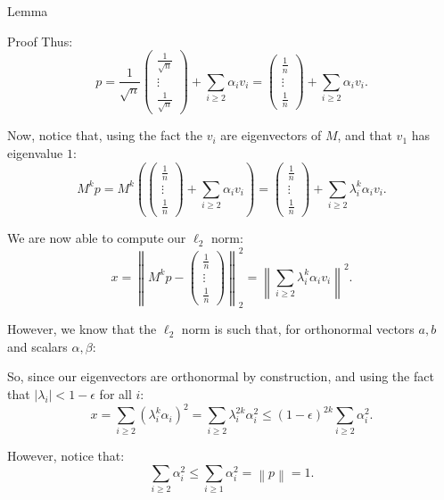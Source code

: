 \documentclass[a4paper]{article}
\begin{document}
\begin{parag}{Lemma}
\begin{subparag}{Proof}
        Thus: 
        \[p = \frac{1}{\sqrt{n}} \begin{pmatrix} \frac{1}{\sqrt{n}} \\ \vdots \\ \frac{1}{\sqrt{n}} \end{pmatrix} + \sum_{i \geq 2} \alpha_i v_i = \begin{pmatrix} \frac{1}{n} \\ \vdots \\ \frac{1}{n} \end{pmatrix} + \sum_{i \geq 2} \alpha_i v_i.\]
        
        Now, notice that, using the fact the $v_i$ are eigenvectors of $M$, and that $v_1$ has eigenvalue $1$: 
        \[M^k p = M^k \left(\begin{pmatrix} \frac{1}{n} \\ \vdots \\ \frac{1}{n} \end{pmatrix} + \sum_{i \geq  2} \alpha_i v_i\right) = \begin{pmatrix} \frac{1}{n} \\ \vdots \\ \frac{1}{n} \end{pmatrix} + \sum_{i \geq 2} \lambda_i^k \alpha_i v_i.\] 

        We are now able to compute our $\ell_2$ norm: 
        \[x = \left\|M^k p - \begin{pmatrix} \frac{1}{n} \\ \vdots \\ \frac{1}{n} \end{pmatrix} \right\|_2^2 = \left\|\sum_{i\geq 2} \lambda_i^k \alpha_i v_i\right\|^2.\] 

        However, we know that the $\ell_2$ norm is such that, for orthonormal vectors $a, b$ and scalars $\alpha, \beta$:

        So, since our eigenvectors are orthonormal by construction, and using the fact that $\left|\lambda_i\right| < 1 - \epsilon$ for all $i$: 
        \[x = \sum_{i \geq 2} \left(\lambda_i^k \alpha_i\right)^2 = \sum_{i \geq 2} \lambda_i^{2k} \alpha_i^2 \leq \left(1 - \epsilon\right)^{2k} \sum_{i \geq 2} \alpha_i^2.\]
        
        However, notice that: 
        \[\sum_{i \geq 2} \alpha_i^2  \leq \sum_{i \geq 1} \alpha_i^2 = \left\|p\right\| = 1.\]
        

\end{subparag}
\end{parag}
\end{document}
